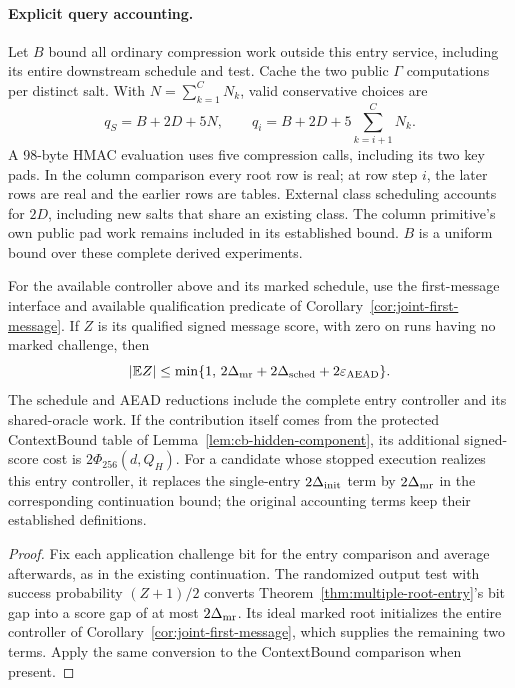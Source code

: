 \paragraph{Explicit query accounting.}
Let $B$ bound all ordinary compression work outside this entry service,
including its entire downstream schedule and test. Cache the two public
$\Gamma$ computations per distinct salt. With
$N=\sum_{k=1}^{C}N_k$, valid conservative choices are
\begin{equation}
 q_S=B+2D+5N,\qquad
 q_i=B+2D+5\sum_{k=i+1}^{C}N_k.
 \label{eq:multiple-root-budgets}
\end{equation}
A 98-byte HMAC evaluation uses five compression calls, including its two key
pads. In the column comparison every root row is real; at row step $i$, the
later rows are real and the earlier rows are tables. External class scheduling
accounts for $2D$, including new salts that share an existing class. The
column primitive's own public pad work remains included in its established
bound. $B$ is a uniform bound over these complete derived experiments.

\begin{corollary}
\label{cor:multiple-root-message}
For the available controller above and its marked schedule, use the
first-message interface and available qualification predicate of Corollary~\ref{cor:joint-first-message}. If $Z$
is its qualified signed message score, with zero on runs having no marked
challenge, then
\begin{equation}
 |\mathbb E Z|\le
 \min\{1,\,2\Delta_{\rm mr}+2\Delta_{\rm sched}
                      +2\varepsilon_{\rm AEAD}\}.
 \label{eq:multiple-root-message}
\end{equation}
The schedule and AEAD reductions include the complete entry controller and
its shared-oracle work. If the contribution itself comes from the protected
ContextBound table of Lemma~\ref{lem:cb-hidden-component}, its additional
signed-score cost is $2\Phi_{256}(d,Q_H)$. For a candidate whose stopped execution realizes this entry controller,
it replaces the single-entry $2\Delta_{\rm init}$ term by
$2\Delta_{\rm mr}$ in the corresponding continuation bound; the original accounting terms keep their
established definitions.
\end{corollary}
\begin{proof}
Fix each application challenge bit for the entry comparison and average
afterwards, as in the existing continuation. The randomized output test
with success probability $(Z+1)/2$ converts
Theorem~\ref{thm:multiple-root-entry}'s bit gap into a score gap of at most
$2\Delta_{\rm mr}$. Its ideal marked root initializes the entire controller
of Corollary~\ref{cor:joint-first-message}, which supplies the remaining two
terms. Apply the same conversion to the ContextBound comparison when present.
\end{proof}
